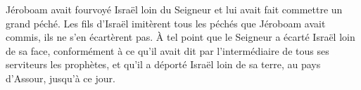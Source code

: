 Jéroboam avait fourvoyé Israël loin du Seigneur
	et lui avait fait commettre un grand péché.
Les fils d’Israël imitèrent tous les péchés que Jéroboam avait commis,
	ils ne s’en écartèrent pas.
À tel point que le Seigneur a écarté Israël loin de sa face,
	conformément à ce qu’il avait dit
		par l’intermédiaire de tous ses serviteurs les prophètes,
	et qu’il a déporté Israël loin de sa terre, au pays d’Assour, jusqu’à ce jour.
